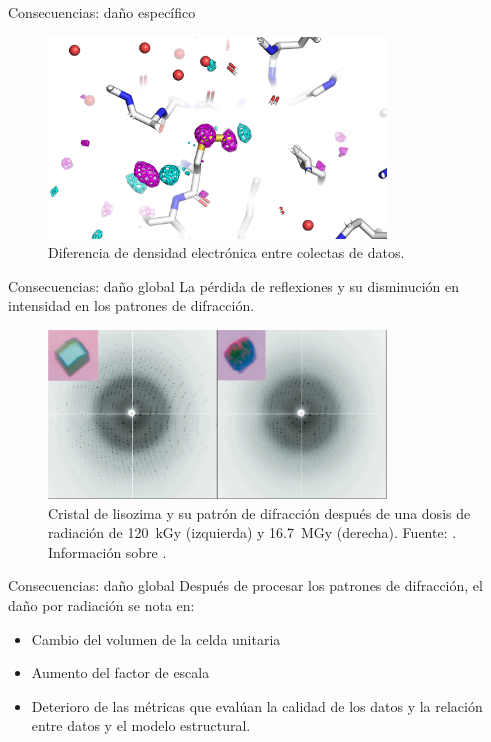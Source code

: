 \documentclass{beamer}
\begin{document}
\begin{frame}{Consecuencias: daño específico}
\begin{figure}[h]
	\centering
	\includegraphics[width=0.8\textwidth]{diff.png}
	\caption{Diferencia de densidad electrónica entre colectas de datos. }
	\label{fig:nanao2005}
\end{figure}
\end{frame}
\begin{frame}{Consecuencias: daño global}
\label{teng}	
La pérdida de reflexiones y su disminución en intensidad en los patrones de difracción. 
\begin{figure}[h]
  \centering
  \includegraphics[width=0.8\textwidth]{teng.png}
  \caption{Cristal de lisozima y su patrón de difracción después de una dosis de radiación de \SI{120}{\kilo\gray} (izquierda) y \SI{16.7}{\mega\gray} (derecha). Fuente: \cite{Teng2000}. Información sobre \hyperlink{backup:grays}{}. }
  \label{fig:teng2000}
\end{figure}
\end{frame}
\begin{frame}{Consecuencias: daño global}
Después de procesar los patrones de difracción, el daño por radiación se nota en:
\begin{itemize}
  \item Cambio del volumen de la celda unitaria
  \item Aumento del factor de escala
  \item Deterioro de las métricas que evalúan la calidad de los datos y la relación entre datos y el modelo estructural. 
\end{itemize}
\end{frame}
\end{document}
